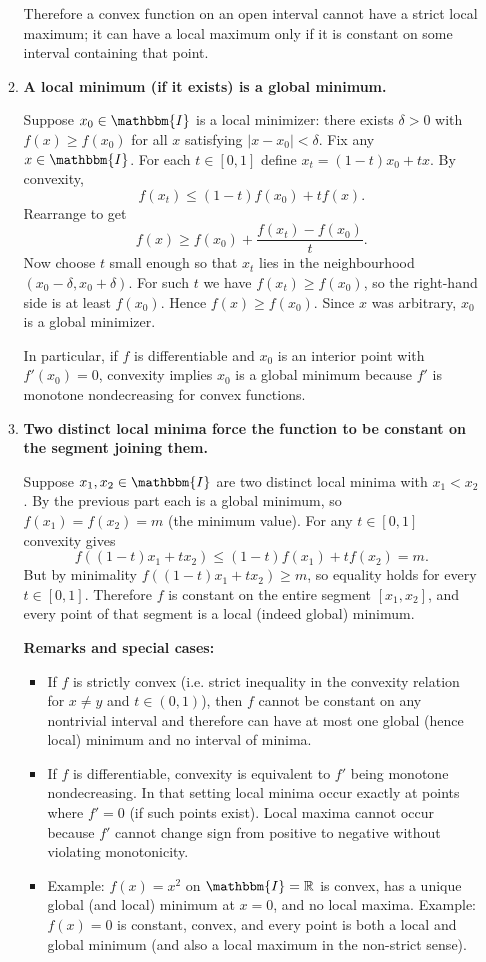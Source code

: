 \documentclass[14pt]{extarticle}
\begin{document}
\begin{enumerate}
\begin{enumerate}
Therefore a convex function on an open interval cannot have a strict local maximum; it can have a local maximum only if it is constant on some interval containing that point.


\item \textbf{A local minimum (if it exists) is a global minimum.}


Suppose $x_0\in\mathbbm{I}$ is a local minimizer: there exists $\delta>0$ with $f(x)\ge f(x_0)$ for all $x$ satisfying $|x-x_0|<\delta$. Fix any $x\in\mathbbm{I}$. For each $t\in[0,1]$ define $x_t=(1-t)x_0 + t x$. By convexity,
\[
f(x_t) \le (1-t)f(x_0) + t f(x).
\]
Rearrange to get
\[
f(x) \ge f(x_0) + \frac{f(x_t)-f(x_0)}{t}.
\]
Now choose $t$ small enough so that $x_t$ lies in the neighbourhood $(x_0-\delta,x_0+\delta)$. For such $t$ we have $f(x_t)\ge f(x_0)$, so the right-hand side is at least $f(x_0)$. Hence $f(x)\ge f(x_0)$. Since $x$ was arbitrary, $x_0$ is a global minimizer.


In particular, if $f$ is differentiable and $x_0$ is an interior point with $f'(x_0)=0$, convexity implies $x_0$ is a global minimum because $f'$ is monotone nondecreasing for convex functions.


\item \textbf{Two distinct local minima force the function to be constant on the segment joining them.}


Suppose $x_1,x_2\in\mathbbm{I}$ are two distinct local minima with $x_1<x_2$. By the previous part each is a global minimum, so $f(x_1)=f(x_2)=m$ (the minimum value). For any $t\in[0,1]$ convexity gives
\[
f((1-t)x_1 + t x_2) \le (1-t)f(x_1) + t f(x_2) = m.
\]
But by minimality $f((1-t)x_1 + t x_2)\ge m$, so equality holds for every $t\in[0,1]$. Therefore $f$ is constant on the entire segment $[x_1,x_2]$, and every point of that segment is a local (indeed global) minimum.


\textbf{Remarks and special cases:}


\begin{itemize}
\item If $f$ is strictly convex (i.e. strict inequality in the convexity relation for $x\ne y$ and $t\in(0,1)$), then $f$ cannot be constant on any nontrivial interval and therefore can have at most one global (hence local) minimum and no interval of minima.
\item If $f$ is differentiable, convexity is equivalent to $f'$ being monotone nondecreasing. In that setting local minima occur exactly at points where $f'=0$ (if such points exist). Local maxima cannot occur because $f'$ cannot change sign from positive to negative without violating monotonicity.
\item Example: $f(x)=x^2$ on $\mathbbm{I}=\mathbb{R}$ is convex, has a unique global (and local) minimum at $x=0$, and no local maxima. Example: $f(x)=0$ is constant, convex, and every point is both a local and global minimum (and also a local maximum in the non-strict sense).
\end{itemize}



\end{enumerate}
\end{enumerate}
\end{document}
